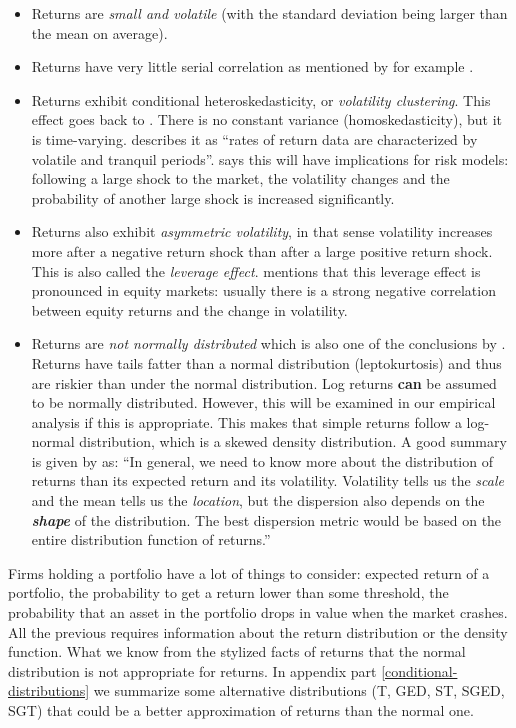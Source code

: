\documentclass[a4paper, nobind]{templates/ociamthesis}
\providecommand{\tightlist}{%
  \setlength{\itemsep}{0pt}\setlength{\parskip}{0pt}}
\begin{document}
\begin{itemize}
\tightlist
\item
  Returns are \emph{small and volatile} (with the standard deviation being larger than the mean on average).
\item
  Returns have very little serial correlation as mentioned by for example \textcite{bollerslev1987}.
\item
  Returns exhibit conditional heteroskedasticity, or \emph{volatility clustering}. This effect goes back to \textcite{mandelbrot1963}. There is no constant variance (homoskedasticity), but it is time-varying. \textcite{bollerslev1987} describes it as ``rates of return data are characterized by volatile and tranquil periods''. \textcite{alexander2008} says this will have implications for risk models: following a large shock to the market, the volatility changes and the probability of another large shock is increased significantly.
\item
  Returns also exhibit \emph{asymmetric volatility}, in that sense volatility increases more after a negative return shock than after a large positive return shock. This is also called the \emph{leverage effect}. \textcite{alexander2008} mentions that this leverage effect is pronounced in equity markets: usually there is a strong negative correlation between equity returns and the change in volatility.
\item
  Returns are \emph{not normally distributed} which is also one of the conclusions by \textcite{fama1965}. Returns have tails fatter than a normal distribution (leptokurtosis) and thus are riskier than under the normal distribution. Log returns \textbf{can} be assumed to be normally distributed. However, this will be examined in our empirical analysis if this is appropriate. This makes that simple returns follow a log-normal distribution, which is a skewed density distribution. A good summary is given by \textcite{alexander2008} as: ``In general, we need to know more about the distribution of returns than its expected return and its volatility. Volatility tells us the \emph{scale} and the mean tells us the \emph{location}, but the dispersion also depends on the \textbf{\emph{shape}} of the distribution. The best dispersion metric would be based on the entire distribution function of returns.''
\end{itemize}

\noindent Firms holding a portfolio have a lot of things to consider: expected return of a portfolio, the probability to get a return lower than some threshold, the probability that an asset in the portfolio drops in value when the market crashes. All the previous requires information about the return distribution or the density function. What we know from the stylized facts of returns that the normal distribution is not appropriate for returns. In appendix part \ref{conditional-distributions} we summarize some alternative distributions (T, GED, ST, SGED, SGT) that could be a better approximation of returns than the normal one.
\end{document}
